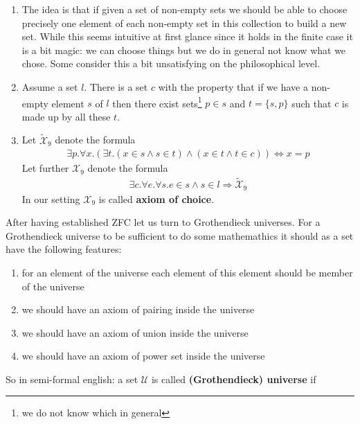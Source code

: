 \begin{enumerate}
\begin{enumerate}
\item[$\bullet$]
The idea is that if given a set of non-empty sets we should be able to choose precisely one element of each non-empty set in this collection to build a new set. While this seems intuitive at first glance since it holds in the finite case it is a bit magic: we can choose things but we do in general not know what we chose. Some consider this a bit unsatisfying on the philosophical level.
\item[$\bullet$]
Assume a set $l$. There is a set $c$ with the property that if we have a non-empty element $s$ of $l$ then there exist sets\footnote{we do not know which in general} $p \in s$ and $t = \lbrace s,p \rbrace$ such that $c$ is made up by all these $t$.
\item[$\bullet$]
Let $\tilde{\mathcal{X}}_{9}$ denote the formula
\begin{align*}
  \exists
  p
  .
  \forall
  x
  .
  \left(
    \exists
    t
    .
    \left(
      x
      \in
      s
      \land
      s
      \in
      t
    \right)
    \land
    \left(
      x
      \in
      t
      \land
      t
      \in
      c
    \right)
  \right)
  \Leftrightarrow
  x
  =
  p
\end{align*}
Let further $\mathcal{X}_{9}$ denote the formula
\begin{align*}
  \exists
  c
  .
  \forall
  e
  .
  \forall
  s
  .
  e
  \in
  s
  \land
  s
  \in
  l
  \Rightarrow
  \tilde{\mathcal{X}}_{9}
\end{align*}
In our setting $\mathcal{X}_{9}$ is called \textbf{axiom of choice}.
\end{enumerate}
\end{enumerate}
After having established ZFC let us turn to Grothendieck universes. For a Grothendieck universe to be sufficient to do some mathemathics it should as a set have the following features:
\begin{enumerate}
\item[(1)]
for an element of the universe each element of this element should be member of the universe
\item[(2)]
we should have an axiom of pairing inside the universe
\item[(3)]
we should have an axiom of union inside the universe
\item[(4)]
we should have an axiom of power set inside the universe
\end{enumerate}
So in semi-formal english: a set $\mathcal{U}$ is called \textbf{(Grothendieck) universe} if
